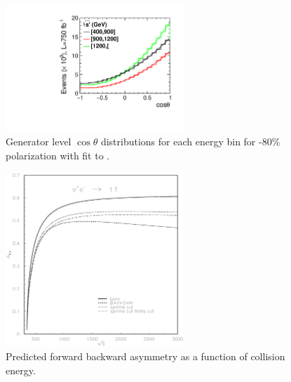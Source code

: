 \begin{figure}
  \centering
  \includegraphics[width=0.6\textwidth]{TopAnalysis/figures/GeneratorTheta.pdf}
  \caption[Generator level $\cos\theta$ distributions for each energy bin]{Generator level $\cos\theta$ distributions for each energy bin for -80\% polarization with fit to .}
  \label{fig:mctheta}
\end{figure}

\begin{figure}
  \centering
  \includegraphics[width=0.6\textwidth]{TopAnalysis/figures/asym-top.eps}
  \caption[Predicted forward backward asymmetry as a function of collision energy]{Predicted forward backward asymmetry as a function of collision energy\cite{Fleischer:2003kk}.}
  \label{fig:afbVEtheory}
\end{figure}

